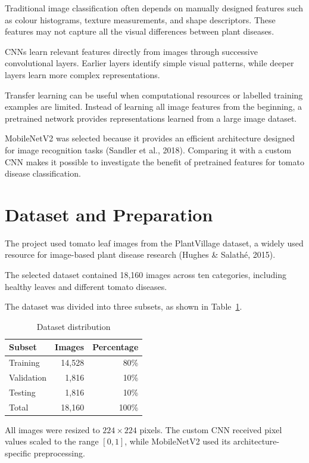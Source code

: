 \documentclass[12pt,a4paper]{article}
\begin{document}
Traditional image classification often depends on manually designed features such as colour histograms, texture measurements, and shape descriptors. These features may not capture all the visual differences between plant diseases.

CNNs learn relevant features directly from images through successive convolutional layers. Earlier layers identify simple visual patterns, while deeper layers learn more complex representations.

Transfer learning can be useful when computational resources or labelled training examples are limited. Instead of learning all image features from the beginning, a pretrained network provides representations learned from a large image dataset.

MobileNetV2 was selected because it provides an efficient architecture designed for image recognition tasks (Sandler et al., 2018). Comparing it with a custom CNN makes it possible to investigate the benefit of pretrained features for tomato disease classification.

\section{Dataset and Preparation}

The project used tomato leaf images from the PlantVillage dataset, a widely used resource for image-based plant disease research (Hughes \& Salathé, 2015).

The selected dataset contained 18,160 images across ten categories, including healthy leaves and different tomato diseases.

The dataset was divided into three subsets, as shown in Table~\ref{tab:splits}.

\begin{table}[H]
\centering
\caption{Dataset distribution}
\label{tab:splits}
\begin{tabular}{lrr}
\toprule
Subset & Images & Percentage\\
\midrule
Training & 14,528 & 80\%\\
Validation & 1,816 & 10\%\\
Testing & 1,816 & 10\%\\
\midrule
Total & 18,160 & 100\%\\
\bottomrule
\end{tabular}
\end{table}

All images were resized to $224 \times 224$ pixels. The custom CNN received pixel values scaled to the range $[0,1]$, while MobileNetV2 used its architecture-specific preprocessing.
\end{document}
